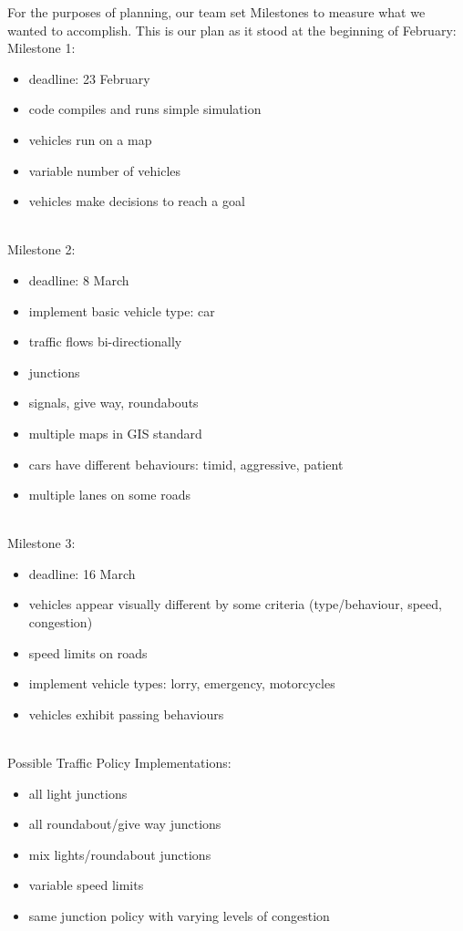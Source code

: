 \documentclass[11pt]{article}
\begin{document}
For the purposes of planning, our team set Milestones to measure what we wanted to accomplish. This is our plan as it stood at the beginning of February: 
\\
Milestone 1:
\begin{itemize}\itemsep0pt
\item deadline: 23 February
\item code compiles and runs simple simulation
\item vehicles run on a map
\item variable number of vehicles
\item vehicles make decisions to reach a goal
\end{itemize}
\\
Milestone 2:
\begin{itemize}\itemsep0pt
\item deadline: 8 March
\item implement basic vehicle type: car
\item traffic flows bi-directionally
\item junctions
\item signals, give way, roundabouts
\item multiple maps in GIS standard
\item cars have different behaviours: timid, aggressive, patient
\item multiple lanes on some roads
\end{itemize}
\\
Milestone 3:
\begin{itemize}\itemsep0pt
\item deadline: 16 March
\item  vehicles appear visually different by some criteria (type/behaviour, speed, congestion)
\item  speed limits on roads
\item  implement vehicle types: lorry, emergency, motorcycles
\item  vehicles exhibit passing behaviours
\end{itemize}
\\
Possible Traffic Policy Implementations:
\begin{itemize}\itemsep0pt
\item all light junctions
\item  all roundabout/give way junctions
\item  mix lights/roundabout junctions
\item  variable speed limits
\item  same junction policy with varying levels of congestion
\end{itemize}
\\
\end{document}
